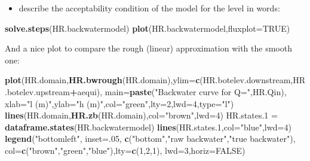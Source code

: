 \documentclass[
]{article}
\newenvironment{Shaded}{\begin{snugshade}}{\end{snugshade}}
\newcommand{\AttributeTok}[1]{\textcolor[rgb]{0.13,0.29,0.53}{#1}}
\newcommand{\ConstantTok}[1]{\textcolor[rgb]{0.56,0.35,0.01}{#1}}
\newcommand{\DecValTok}[1]{\textcolor[rgb]{0.00,0.00,0.81}{#1}}
\newcommand{\FloatTok}[1]{\textcolor[rgb]{0.00,0.00,0.81}{#1}}
\newcommand{\FunctionTok}[1]{\textcolor[rgb]{0.13,0.29,0.53}{\textbf{#1}}}
\newcommand{\NormalTok}[1]{#1}
\newcommand{\OtherTok}[1]{\textcolor[rgb]{0.56,0.35,0.01}{#1}}
\newcommand{\SpecialCharTok}[1]{\textcolor[rgb]{0.81,0.36,0.00}{\textbf{#1}}}
\newcommand{\StringTok}[1]{\textcolor[rgb]{0.31,0.60,0.02}{#1}}
\providecommand{\tightlist}{%
  \setlength{\itemsep}{0pt}\setlength{\parskip}{0pt}}
\begin{document}
\begin{itemize}
\tightlist
\item
  describe the acceptability condition of the model for the level in
  words:
\end{itemize}

\begin{Shaded}
\begin{Highlighting}[]
\FunctionTok{solve.steps}\NormalTok{(HR.backwatermodel)}
\FunctionTok{plot}\NormalTok{(HR.backwatermodel,}\AttributeTok{fluxplot=}\ConstantTok{TRUE}\NormalTok{)}
\end{Highlighting}
\end{Shaded}

And a nice plot to compare the rough (linear) approximation with the
smooth one:

\begin{Shaded}
\begin{Highlighting}[]
\FunctionTok{plot}\NormalTok{(HR.domain,}\FunctionTok{HR.bwrough}\NormalTok{(HR.domain),}\AttributeTok{ylim=}\FunctionTok{c}\NormalTok{(HR.botelev.downstream,HR.botelev.upstream}\SpecialCharTok{+}\NormalTok{aequi),}
     \AttributeTok{main=}\FunctionTok{paste}\NormalTok{(}\StringTok{"Backwater curve for Q="}\NormalTok{,HR.Qin),}
     \AttributeTok{xlab=}\StringTok{"l (m)"}\NormalTok{,}\AttributeTok{ylab=}\StringTok{"h (m)"}\NormalTok{,}\AttributeTok{col=}\StringTok{"green"}\NormalTok{,}\AttributeTok{lty=}\DecValTok{2}\NormalTok{,}\AttributeTok{lwd=}\DecValTok{4}\NormalTok{,}\AttributeTok{type=}\StringTok{"l"}\NormalTok{)}
\FunctionTok{lines}\NormalTok{(HR.domain,}\FunctionTok{HR.zb}\NormalTok{(HR.domain),}\AttributeTok{col=}\StringTok{"brown"}\NormalTok{,}\AttributeTok{lwd=}\DecValTok{4}\NormalTok{)}
\NormalTok{HR.states}\FloatTok{.1} \OtherTok{=} \FunctionTok{dataframe.states}\NormalTok{(HR.backwatermodel)}
\FunctionTok{lines}\NormalTok{(HR.states}\FloatTok{.1}\NormalTok{,}\AttributeTok{col=}\StringTok{"blue"}\NormalTok{,}\AttributeTok{lwd=}\DecValTok{4}\NormalTok{)}
\FunctionTok{legend}\NormalTok{(}\StringTok{"bottomleft"}\NormalTok{, }\AttributeTok{inset=}\NormalTok{.}\DecValTok{05}\NormalTok{,}
       \FunctionTok{c}\NormalTok{(}\StringTok{"bottom"}\NormalTok{,}\StringTok{"raw backwater"}\NormalTok{,}\StringTok{"true backwater"}\NormalTok{), }
       \AttributeTok{col=}\FunctionTok{c}\NormalTok{(}\StringTok{"brown"}\NormalTok{,}\StringTok{"green"}\NormalTok{,}\StringTok{"blue"}\NormalTok{),}\AttributeTok{lty=}\FunctionTok{c}\NormalTok{(}\DecValTok{1}\NormalTok{,}\DecValTok{2}\NormalTok{,}\DecValTok{1}\NormalTok{),}
       \AttributeTok{lwd=}\DecValTok{3}\NormalTok{,}\AttributeTok{horiz=}\ConstantTok{FALSE}\NormalTok{)}
\end{Highlighting}
\end{Shaded}
\end{document}
